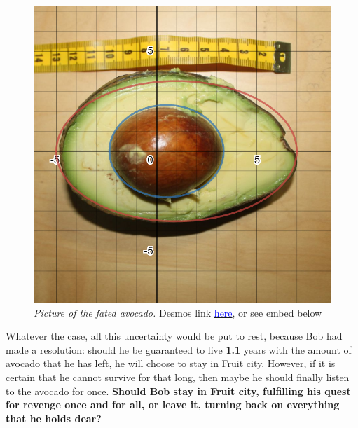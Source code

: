 \documentclass[letterpaper, 12pt]{article}
\begin{document}
\begin{figure}[h]
    \begin{center}
        \includegraphics[scale=.3]{avocad.png}
        \caption{\textit{Picture of the fated avocado.} Desmos link \href{https://www.desmos.com/calculator/i0kemx2ihg}{\textcolor{blue}{here}}, or see embed below}
    \end{center}
\end{figure}
Whatever the case, all this uncertainty would be put to rest, because Bob had made a resolution: should he be guaranteed to live \textbf{1.1} years with the amount of avocado that he has left, he will choose to stay in Fruit city. However, if it is certain that he cannot survive for that long, then maybe he should finally listen to the avocado for once. \textbf{Should Bob stay in Fruit city, fulfilling his quest for revenge once and for all, or leave it, turning back on everything that he holds dear?}
\end{document}

